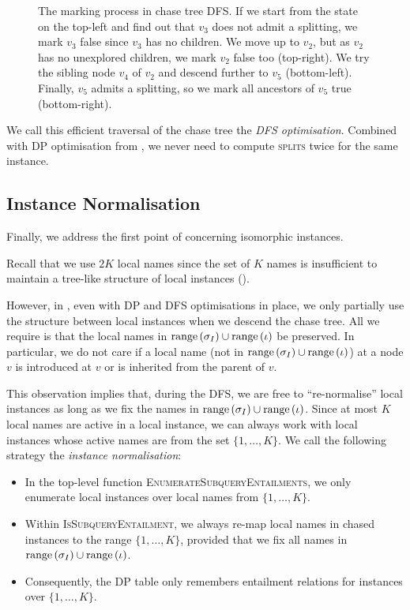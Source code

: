 \documentclass[12pt]{report}
\theoremstyle{plain}
\theoremstyle{definition}
\newcommand{\range}[1]{\ensuremath{\normalfont{\operatorname{range}} \left( #1 \right)}}
\begin{document}
\begin{figure}[t]
  \centering
  
  \caption{The marking process in chase tree DFS. If we start from the state on the top-left and find out that $v_3$ does not admit a splitting, we mark $v_3$ false since $v_3$ has no children. We move up to $v_2$, but as $v_2$ has no unexplored children, we mark $v_2$ false too (top-right). We try the sibling node $v_4$ of $v_2$ and descend further to $v_5$ (bottom-left). Finally, $v_5$ admits a splitting, so we mark all ancestors of $v_5$ true (bottom-right).}
  \label{figure:sctree-dfs-marking}
\end{figure}

We call this efficient traversal of the chase tree the \emph{DFS optimisation}. Combined with DP optimisation from , we never need to compute \textsc{splits} twice for the same instance.

\subsection{Instance Normalisation}
\label{subsection:instance-normalisation}

Finally, we address the first point of  concerning isomorphic instances.

Recall that we use $2K$ local names since the set of $K$ names is insufficient to maintain a tree-like structure of local instances ().

However, in , even with DP and DFS optimisations in place, we only partially use the structure between local instances when we descend the chase tree. All we require is that the local names in $\range{\sigma_I} \cup \range{\iota}$ be preserved. In particular, we do not care if a local name (not in $\range{\sigma_I} \cup \range{\iota}$) at a node $v$ is introduced at $v$ or is inherited from the parent of $v$.

This observation implies that, during the DFS, we are free to ``re-normalise'' local instances as long as we fix the names in $\range{\sigma_I} \cup \range{\iota}$. Since at most $K$ local names are active in a local instance, we can always work with local instances whose active names are from the set $\{ 1, \ldots, K \}$. We call the following strategy the \emph{instance normalisation}:

\begin{itemize}
  \item In the top-level function \textsc{EnumerateSubqueryEntailments}, we only enumerate local instances over local names from $\{ 1, \ldots, K \}$. 
  \item Within \textsc{IsSubqueryEntailment}, we always re-map local names in chased instances to the range $\{ 1, \ldots, K \}$, provided that we fix all names in $\range{\sigma_I} \cup \range{\iota}$.
  \item Consequently, the DP table only remembers entailment relations for instances over $\{ 1, \ldots, K \}$.
\end{itemize}
\end{document}
